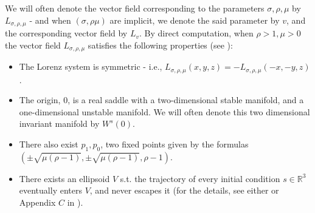 \documentclass[10pt,reqno]{amsart}
\theoremstyle{plain}
\theoremstyle{assumption}
\theoremstyle{notation}
\theoremstyle{claim}
\theoremstyle{conj}
\theoremstyle{theorem}
\theoremstyle{proposition}
\theoremstyle{corollary}
\begin{document}
We will often denote the vector field corresponding to the parameters $\sigma,\rho, \mu$ by $L_{\sigma,\rho,\mu}$ - and when $(\sigma,\rho\mu)$ are implicit, we denote the said parameter by $v$, and the corresponding vector field by $L_v$. By direct computation, when $\rho>1,\mu>0$ the vector field $L_{\sigma,\rho,\mu}$ satisfies the following properties (see \cite{Lo}):
\begin{itemize}
    \item The Lorenz system is symmetric - i.e., $L_{\sigma,\rho,\mu}(x,y,z)=-L_{\sigma,\rho,\mu}(-x,-y,z)$.
    \item The origin, $0$, is a real saddle with a two-dimensional stable manifold, and a one-dimensional unstable manifold. We will often denote this two dimensional invariant manifold by $W^s(0)$.
    \item  There also exist $p_1,p_0$, two fixed points given by the formulas $(\pm\sqrt{\mu(\rho-1)},\pm\sqrt{\mu(\rho-1)},\rho-1)$. 
    \item There exists an ellipsoid $V$ s.t. the trajectory of every initial condition $s\in\mathbb{R}^3$ eventually enters $V$, and never escapes it (for the details, see either \cite{Lo} or Appendix $C$ in \cite{Sparbook}).
\end{itemize}
\end{document}
